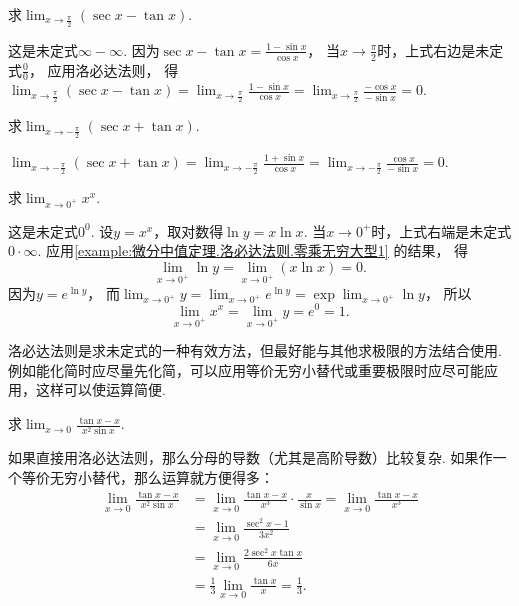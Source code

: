 \begin{example}
求\(\lim_{x\to\frac\pi2} (\sec x-\tan x)\).
\begin{solution}
这是未定式\(\infty-\infty\).
因为\(\sec x-\tan x = \frac{1-\sin x}{\cos x}\)，
当\(x\to\frac\pi2\)时，上式右边是未定式\(\frac00\)，
应用洛必达法则，
得\(\lim_{x\to\frac\pi2} (\sec x-\tan x)
= \lim_{x\to\frac\pi2} \frac{1-\sin x}{\cos x}
= \lim_{x\to\frac\pi2} \frac{-\cos x}{-\sin x}
= 0\).
\end{solution}
\end{example}

\begin{example}
求\(\lim_{x\to-\frac\pi2} (\sec x+\tan x)\).
\begin{solution}
\(\lim_{x\to-\frac\pi2} (\sec x+\tan x)
= \lim_{x\to-\frac\pi2} \frac{1+\sin x}{\cos x}
= \lim_{x\to-\frac\pi2} \frac{\cos x}{-\sin x}
= 0\).
\end{solution}
\end{example}

\begin{example}\label{example:微分中值定理.洛必达法则.零次方零型1}
求\(\lim_{x\to0^+} x^x\).
\begin{solution}
这是未定式\(0^0\).
设\(y = x^x\)，取对数得\(\ln y = x \ln x\).
当\(x\to0^+\)时，上式右端是未定式\(0\cdot\infty\).
应用\cref{example:微分中值定理.洛必达法则.零乘无穷大型1} 的结果，
得\[
	\lim_{x\to0^+} \ln y
	= \lim_{x\to0^+} (x \ln x) = 0.
\]
因为\(y = e^{\ln y}\)，
而\(\lim_{x\to0^+} y
= \lim_{x\to0^+} e^{\ln y}
= \exp\lim_{x\to0^+} \ln y\)，
所以\[
	\lim_{x\to0^+} x^x
	= \lim_{x\to0^+} y
	= e^0
	= 1.
\]
\end{solution}
\end{example}

洛必达法则是求未定式的一种有效方法，但最好能与其他求极限的方法结合使用.
例如能化简时应尽量先化简，可以应用等价无穷小替代或重要极限时应尽可能应用，这样可以使运算简便.

\begin{example}
求\(\lim_{x\to0} \frac{\tan x - x}{x^2 \sin x}\).
\begin{solution}
如果直接用洛必达法则，那么分母的导数（尤其是高阶导数）比较复杂.
如果作一个等价无穷小替代，那么运算就方便得多：
\begin{align*}
	\lim_{x\to0} \frac{\tan x - x}{x^2 \sin x}
	&= \lim_{x\to0} \frac{\tan x - x}{x^3} \cdot \frac{x}{\sin x}
	= \lim_{x\to0} \frac{\tan x - x}{x^3} \\
	&= \lim_{x\to0} \frac{\sec^2 x - 1}{3x^2} \\
	&= \lim_{x\to0} \frac{2\sec^2 x \tan x}{6x} \\
	&= \frac13 \lim_{x\to0} \frac{\tan x}{x} = \frac13.
\end{align*}
\end{solution}
\end{example}

